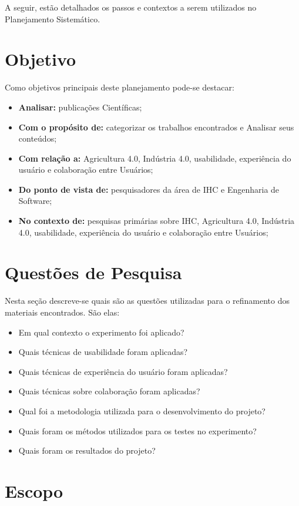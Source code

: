 \documentclass[12pt]{article}
\begin{document}
A seguir, estão detalhados os passos e contextos a serem utilizados no Planejamento Sistemático.

\section{Objetivo}

Como objetivos principais deste planejamento pode-se destacar:

\begin{itemize}
	\item \textbf{Analisar:} publicações Científicas;
	\item \textbf{Com o propósito de:} categorizar os trabalhos encontrados e Analisar seus conteúdos;
	\item \textbf{Com relação a:} Agricultura 4.0, Indústria 4.0, usabilidade, experiência do usuário e colaboração entre Usuários;
	\item \textbf{Do ponto de vista de:} pesquisadores da área de IHC e Engenharia de Software;
	\item \textbf{No contexto de:} pesquisas primárias sobre IHC, Agricultura 4.0, Indústria 4.0, usabilidade, experiência do usuário e colaboração entre Usuários;
\end{itemize}

\section{Questões de Pesquisa}

Nesta seção descreve-se quais são as questões utilizadas para o refinamento dos materiais encontrados. São elas:

\begin{itemize}
	\item Em qual contexto o experimento foi aplicado?
	\item Quais técnicas de usabilidade foram aplicadas?
	\item Quais técnicas de experiência do usuário foram aplicadas?
	\item Quais técnicas sobre colaboração foram aplicadas?
	\item Qual foi a metodologia utilizada para o desenvolvimento do projeto?
	\item Quais foram os métodos utilizados para os testes no experimento?
	\item Quais foram os resultados do projeto?
\end{itemize}

\section{Escopo}
\end{document}
